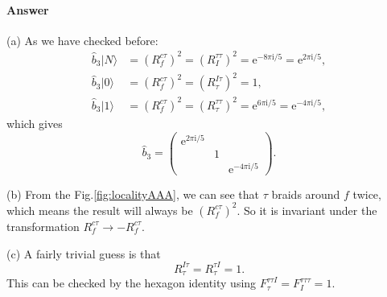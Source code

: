 \paragraph{Answer}
(a) As we have checked before:
\begin{equation*}
\begin{aligned}
\hat{b}_{3} |N\rangle  & =(R_{f}^{c\tau } )^{2} =(R_{I}^{\tau \tau } )^{2} =\mathrm{e}^{-8\pi \mathrm{i} /5} =\mathrm{e}^{2\pi \mathrm{i} /5} ,\\
\hat{b}_{3} |0\rangle  & =(R_{f}^{c\tau } )^{2} =(R_{\tau }^{I\tau } )^{2} =1,\\
\hat{b}_{3} |1\rangle  & =(R_{f}^{c\tau } )^{2} =(R_{\tau }^{\tau \tau } )^{2} =\mathrm{e}^{6\pi \mathrm{i} /5} =\mathrm{e}^{-4\pi \mathrm{i} /5} ,
\end{aligned}
\end{equation*}
which gives
\begin{equation*}
\hat{b}_{3} =\begin{pmatrix}
\mathrm{e}^{2\pi \mathrm{i} /5} &  & \\
 & 1 & \\
 &  & \mathrm{e}^{-4\pi \mathrm{i} /5}
\end{pmatrix} .
\end{equation*}


(b) From the Fig.\ref{fig:localityAAA}, we can see that $\tau $ braids around $f$ twice, which means the result will always be $(R_{f}^{c\tau } )^{2}$. So it is invariant under the transformation $R_{f}^{c\tau }\rightarrow -R_{f}^{c\tau }$. 



(c) A fairly trivial guess is that
\begin{equation*}
R_{\tau }^{I\tau } =R_{\tau }^{\tau I} =1.
\end{equation*}
This can be checked by the hexagon identity using $F_{\tau }^{\tau \tau I} =F_{I}^{\tau \tau \tau } =1$. 



